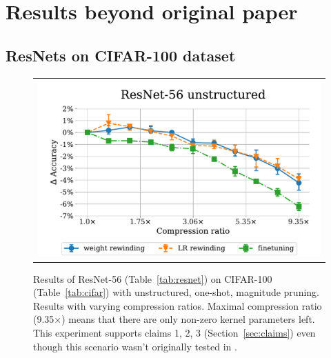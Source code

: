 



\section{Results beyond original paper}
 
\subsection{ResNets on CIFAR-100 dataset}
\nopagebreak
\begin{figure}[H]
\setlength{\tabcolsep}{0pt}
\centering
    \begin{tabular}{c}
      \includegraphics[width=0.7\linewidth]{pics/Resnet56-C100.pdf}
    \end{tabular}
\caption{Results of ResNet-56 (Table~\ref{tab:resnet}) on CIFAR-100 (Table~\ref{tab:cifar}) with unstructured, one-shot, magnitude pruning. Results with varying compression ratios. Maximal compression ratio (9.35$\times$) means that there are only  non-zero kernel parameters left. This experiment supports claims 1, 2, 3 (Section~\ref{sec:claims}) even though this scenario wasn't originally tested in \cite{Renda}.}
\label{fig:resnet56-2}
\end{figure}

